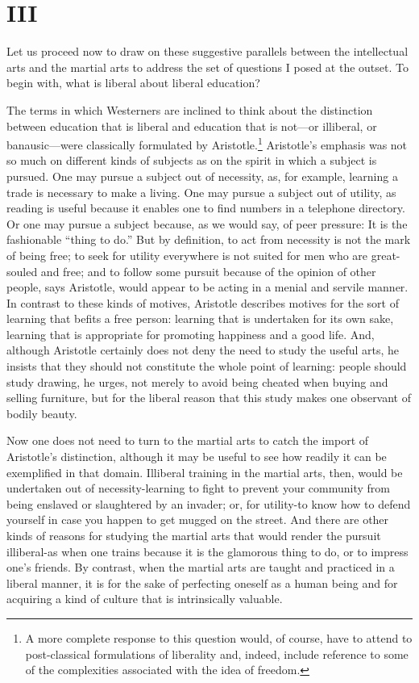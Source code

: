 \section*{III}

Let us proceed now to draw on these suggestive parallels between the intellectual arts and the martial arts to address the set of questions I posed at the outset. To begin with, what is liberal about liberal education? 

The terms in which Westerners are inclined to think about the distinction between education that is liberal and education that is not---or illiberal, or banausic---were classically formulated by Aristotle.\footnote{A more complete response to this question would, of course, have to attend to post-classical formulations of liberality and, indeed, include reference to some of the complexities associated with the idea of freedom.} Aristotle's emphasis was not so much on different kinds of subjects as on the spirit in which a subject is pursued. One may pursue a subject out of necessity, as, for example, learning a trade is necessary to make a living. One may pursue a subject out of utility, as reading is useful because it enables one to find numbers in a telephone directory. Or one may pursue a subject because, as we would say, of peer pressure: It is the fashionable ``thing to do.'' But by definition, to act from necessity is not the mark of being free; to seek for utility everywhere is not suited for men who are great-souled and free; and to follow some pursuit because of the opinion of other people, says Aristotle, would appear to be acting in a menial and servile manner. In contrast to these kinds of motives, Aristotle describes motives for the sort of learning that befits a free person: learning that is undertaken for its own sake, learning that is appropriate for promoting happiness and a good life. And, although Aristotle certainly does not deny the need to study the useful arts, he insists that they should not constitute the whole point of learning: people should study drawing, he urges, not merely to avoid being cheated when buying and selling furniture, but for the liberal reason that this study makes one observant of bodily beauty. 

Now one does not need to turn to the martial arts to catch the import of Aristotle's distinction, although it may be useful to see how readily it can be exemplified in that domain. Illiberal training in the martial arts, then, would be undertaken out of necessity-learning to fight to prevent your community from being enslaved or slaughtered by an invader; or, for utility-to know how to defend yourself in case you happen to get mugged on the street. And there are other kinds of reasons for studying the martial arts that would render the pursuit illiberal-as when one trains because it is the glamorous thing to do, or to impress one's friends. By contrast, when the martial arts are taught and practiced in a liberal manner, it is for the sake of perfecting oneself as a human being and for acquiring a kind of culture that is intrinsically valuable. 

